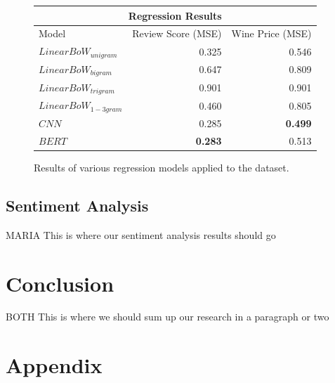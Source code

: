 \documentclass[11pt]{article}
\begin{document}
    \begin{figure}
    \centering
    \begin{tabular}{ |l||r|r|  }
        \hline
        \multicolumn{3}{|c|}{Regression Results} \\
        \hline
        Model& Review Score (MSE) & Wine Price (MSE) \\
        \hline
        $Linear BoW_{unigram}$   & 0.325          & 0.546 \\
        $Linear BoW_{bigram}$    & 0.647          & 0.809 \\
        $Linear BoW_{trigram}$   & 0.901          & 0.901 \\
        $Linear BoW_{1-3gram}$   & 0.460          & 0.805 \\
        \hline
        $CNN$                    & 0.285          & \textbf{0.499} \\
        \hline
        $BERT$                   & \textbf{0.283} & 0.513 \\
        \hline
    \end{tabular}
    \caption{ Results of various regression models applied to the dataset. }
    \label{regression_results}
    \end{figure}

\subsection{Sentiment Analysis}
    MARIA
    This is where our sentiment analysis results should go

\section{Conclusion}
    BOTH
    This is where we should sum up our research in a paragraph or two

\newpage


\newpage
\section{Appendix}
\end{document}
